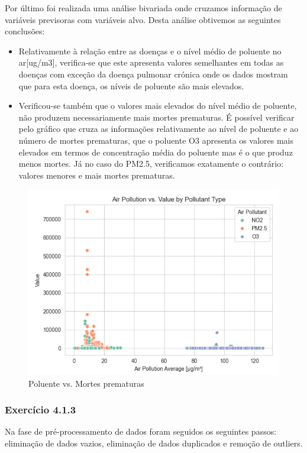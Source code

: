 \documentclass[conference]{IEEEtran}
\begin{document}
Por último foi realizada uma análise bivariada onde cruzamos informação de variáveis previsoras com variáveis alvo. Desta análise obtivemos as seguintes conclusões:
\begin{itemize}
	\item Relativamente à relação entre as doenças e o nível médio de poluente no ar[ug/m3], verifica-se que este apresenta valores semelhantes em todas as doenças com exceção da doença pulmonar crónica onde os dados mostram que para esta doença, os níveis de poluente são mais elevados.
	\item Verificou-se também que o valores mais elevados do nível médio de poluente, não produzem necessariamente mais mortes prematuras. É possível verificar pelo gráfico que cruza as informações relativamente ao nível de poluente e ao número de mortes prematuras, que o poluente O3 apresenta os valores mais elevados em termos de concentração média do poluente mas é o que produz menos mortes. Já no caso do PM2.5, verificamos exatamente o contrário: valores menores e mais mortes prematuras.
\end{itemize}

\begin{figure}[H]
	\centering
	\includegraphics[width=0.8\linewidth]{AirPolValuePollutant}
	\caption{Poluente vs. Mortes prematuras}
	\label{fig:AvgByPollutant}
\end{figure}



\medskip
\subsubsection{\textbf{Exercício 4.1.3}}

Na fase de pré-processamento de dados foram seguidos os seguintes passos: eliminação de dados vazios, eliminação de dados duplicados e remoção de outliers. 
\end{document}
